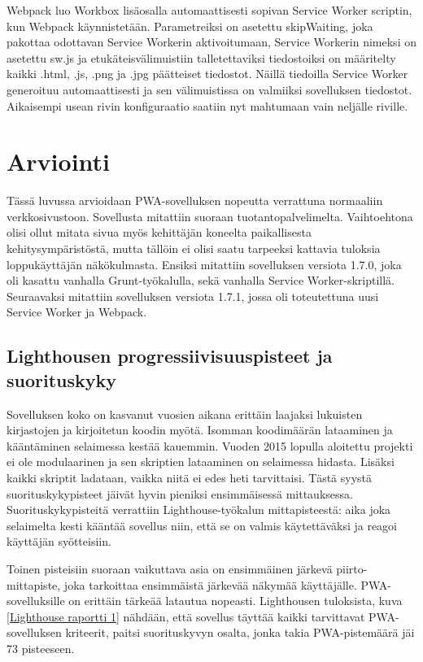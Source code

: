 \documentclass{tktltiki}
\begin{document}
Webpack luo Workbox lisäosalla automaattisesti sopivan Service Worker scriptin, kun Webpack käynnistetään. Parametreiksi on asetettu skipWaiting, joka pakottaa odottavan Service Workerin aktivoitumaan, Service Workerin nimeksi on asetettu sw.js ja etukäteisvälimuistiin talletettaviksi tiedostoiksi on määritelty kaikki .html, .js, .png ja .jpg päätteiset tiedostot. Näillä tiedoilla Service Worker generoituu automaattisesti ja sen välimuistissa on valmiiksi sovelluksen tiedostot. Aikaisempi usean rivin konfiguraatio saatiin nyt mahtumaan vain neljälle riville. 

\clearpage
\newpage
\section{Arviointi}

Tässä luvussa arvioidaan PWA-sovelluksen nopeutta verrattuna normaaliin verkkosivustoon. 
Sovellusta mitattiin suoraan tuotantopalvelimelta. Vaihtoehtona olisi ollut mitata sivua myös kehittäjän koneelta paikallisesta kehitysympäristöstä, mutta tällöin ei olisi saatu tarpeeksi kattavia tuloksia loppukäyttäjän näkökulmasta. Ensiksi mitattiin sovelluksen versiota 1.7.0, joka oli kasattu vanhalla Grunt-työkalulla, sekä vanhalla Service Worker-skriptillä. Seuraavaksi mitattiin sovelluksen versiota 1.7.1, jossa oli toteutettuna uusi Service Worker ja Webpack.

\subsection{Lighthousen progressiivisuuspisteet ja suorituskyky}

Sovelluksen koko on kasvanut vuosien aikana erittäin laajaksi lukuisten kirjastojen ja kirjoitetun koodin myötä. Isomman koodimäärän lataaminen ja kääntäminen selaimessa kestää kauemmin. Vuoden 2015 lopulla aloitettu projekti ei ole modulaarinen ja sen skriptien lataaminen on selaimessa hidasta. Lisäksi kaikki skriptit ladataan, vaikka niitä ei edes heti tarvittaisi. Tästä syystä suorituskykypisteet jäivät hyvin pieniksi ensimmäisessä mittauksessa. Suorituskykypisteitä verrattiin Lighthouse-työkalun mittapisteestä: aika joka selaimelta kesti kääntää sovellus niin, että se on valmis käytettäväksi ja reagoi käyttäjän syötteisiin.

Toinen pisteisiin suoraan vaikuttava asia on ensimmäinen järkevä piirto-mittapiste, joka tarkoittaa ensimmäistä järkevää näkymää käyttäjälle. PWA-sovelluksille on erittäin tärkeää latautua nopeasti.  Lighthousen tuloksista, kuva \ref{Lighthouse raportti 1} nähdään, että sovellus täyttää kaikki tarvittavat PWA-sovelluksen kriteerit, paitsi suorituskyvyn osalta, jonka takia PWA-pistemäärä jäi 73 pisteeseen.
\end{document}
